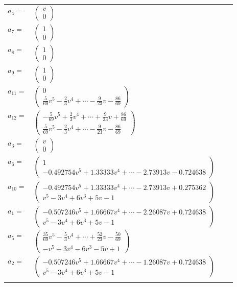 \documentclass[1p]{elsarticle_modified}
\theoremstyle{definition}
\begin{document}
\begin{tabular}{m{7pt} m{180pt} m{7pt} m{180pt} }
\flushright $a_{4}=$&$\begin{pmatrix}v\\0\end{pmatrix}$ \\
\flushright $a_{7}=$&$\begin{pmatrix}1\\0\end{pmatrix}$ \\
\flushright $a_{8}=$&$\begin{pmatrix}1\\0\end{pmatrix}$ \\
\flushright $a_{9}=$&$\begin{pmatrix}1\\0\end{pmatrix}$ \\
\flushright $a_{11}=$&$\begin{pmatrix}0\\\frac{5}{69} v^5-\frac{2}{3} v^4+\cdots-\frac{9}{23} v-\frac{86}{69}\end{pmatrix}$ \\
\flushright $a_{12}=$&$\begin{pmatrix}-\frac{5}{69} v^5+\frac{2}{3} v^4+\cdots+\frac{9}{23} v+\frac{86}{69}\\\frac{5}{69} v^5-\frac{2}{3} v^4+\cdots-\frac{9}{23} v-\frac{86}{69}\end{pmatrix}$ \\
\flushright $a_{3}=$&$\begin{pmatrix}v\\0\end{pmatrix}$ \\
\flushright $a_{6}=$&$\begin{pmatrix}1\\-0.492754 v^{5}+1.33333 v^{4}+\cdots-2.73913 v-0.724638\end{pmatrix}$ \\
\flushright $a_{10}=$&$\begin{pmatrix}-0.492754 v^{5}+1.33333 v^{4}+\cdots-2.73913 v+0.275362\\v^5-3 v^4+6 v^3+5 v-1\end{pmatrix}$ \\
\flushright $a_{1}=$&$\begin{pmatrix}-0.507246 v^{5}+1.66667 v^{4}+\cdots-2.26087 v+0.724638\\v^5-3 v^4+6 v^3+5 v-1\end{pmatrix}$ \\
\flushright $a_{5}=$&$\begin{pmatrix}\frac{35}{69} v^5-\frac{5}{3} v^4+\cdots+\frac{52}{23} v-\frac{50}{69}\\- v^5+3 v^4-6 v^3-5 v+1\end{pmatrix}$ \\
\flushright $a_{2}=$&$\begin{pmatrix}-0.507246 v^{5}+1.66667 v^{4}+\cdots-1.26087 v+0.724638\\v^5-3 v^4+6 v^3+5 v-1\end{pmatrix}$\\&\end{tabular}
\end{document}
